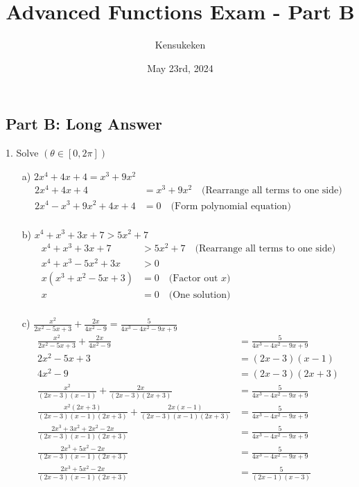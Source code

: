 \documentclass{article}
\title{Advanced Functions Exam - Part B}
\author{Kensukeken}
\date{May 23rd, 2024}
\newenvironment{solution}{\color{solutioncolor}}{}
\begin{document}
\maketitle

\subsection*{Part B: Long Answer}
1. Solve $(\theta \in [0, 2\pi])$
\begin{enumerate}
    \item[a)] $2x^4+4x+4=x^3+9x^2$
    \begin{solution}
        \begin{align*}
            2x^4 + 4x + 4 &= x^3 + 9x^2 \quad \text{(Rearrange all terms to one side)} \\
            2x^4 - x^3 + 9x^2 + 4x + 4 &= 0 \quad \text{(Form polynomial equation)} \\
        \end{align*}
    \end{solution}
    
    \item[b)] $x^4 + x^3 + 3x + 7 > 5x^2 + 7$
    \begin{solution}
        \begin{align*}
            x^4 + x^3 + 3x + 7 &> 5x^2 + 7 \quad \text{(Rearrange all terms to one side)} \\
            x^4 + x^3 - 5x^2 + 3x &> 0 \\
            x(x^3 + x^2 - 5x + 3) &= 0 \quad \text{(Factor out } x \text{)} \\
            x &= 0 \quad \text{(One solution)} \\
\end{align*}
    \end{solution}
    
    \item[c)] $\frac{x^2}{2x^2-5x+3} + \frac{2x}{4x^2-9} = \frac{5}{4x^3 - 4x^2 - 9x + 9}$
    \begin{solution}
       \begin{align*}
\frac{x^2}{2x^2-5x+3} + \frac{2x}{4x^2-9} &= \frac{5}{4x^3 - 4x^2 - 9x + 9} \\
2x^2 - 5x + 3 &= (2x - 3)(x - 1) \\
4x^2 - 9 &= (2x - 3)(2x + 3) \\
\frac{x^2}{(2x - 3)(x - 1)} + \frac{2x}{(2x - 3)(2x + 3)} &= \frac{5}{4x^3 - 4x^2 - 9x + 9} \\
\frac{x^2(2x + 3)}{(2x - 3)(x - 1)(2x + 3)} + \frac{2x(x - 1)}{(2x - 3)(x - 1)(2x + 3)} &= \frac{5}{4x^3 - 4x^2 - 9x + 9} \\
\frac{2x^3 + 3x^2 + 2x^2 - 2x}{(2x - 3)(x - 1)(2x + 3)} &= \frac{5}{4x^3 - 4x^2 - 9x + 9} \\
\frac{2x^3 + 5x^2 - 2x}{(2x - 3)(x - 1)(2x + 3)} &= \frac{5}{4x^3 - 4x^2 - 9x + 9} \\
\frac{2x^3 + 5x^2 - 2x}{(2x - 3)(x - 1)(2x + 3)} &= \frac{5}{(2x - 1)(x - 3)}
\end{align*}


\end{solution}
\end{enumerate}
\end{document}
